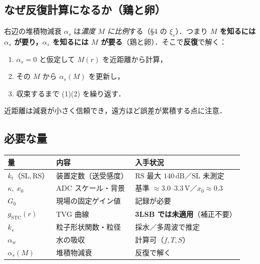 \documentclass[11pt]{ltjsarticle}
\newcommand{\unit}[1]{\,\mathrm{#1}}
\begin{document}
\subsection{なぜ反復計算になるか（鶏と卵）}
右辺の堆積物減衰 $\alpha_s$ は\emph{濃度 $M$ に比例}する（\S4 の $\xi_s$）．つまり
\textbf{$M$ を知るには $\alpha_s$ が要り，$\alpha_s$ を知るには $M$ が要る}（鶏と卵）．そこで\textbf{反復}で解く：
\begin{enumerate}[nosep]
  \item $\alpha_s=0$ と仮定して $M(r)$ を近距離から計算，
  \item その $M$ から $\alpha_s(M)$ を更新し，
  \item 収束するまで (1)(2) を繰り返す．
\end{enumerate}
近距離は減衰が小さく信頼でき，遠方ほど誤差が累積する点に注意．

\subsection{必要な量}
\begin{center}\small
\begin{tabular}{lll}
\toprule
量 & 内容 & 入手状況 \\
\midrule
$k_t$（$\mathrm{SL},\mathrm{RS}$） & 装置定数（送受感度） & $\mathrm{RS}$ 最大 $140\unit{dB}$／$\mathrm{SL}$ 未測定 \\
$\kappa,\ x_0$ & ADC スケール・背景 & 基準 $\approx3.0$–$3.3\unit{V}$／$x_0\approx0.3$ \\
$G_0$ & 現場の固定ゲイン値 & 記録が必要 \\
$g_{\mathrm{STC}}(r)$ & TVG 曲線 & \textbf{3LSB では未適用}（補正不要） \\
$k_s$ & 粒子形状関数・粒径 & 採水／多周波で推定 \\
$\alpha_w$ & 水の吸収 & 計算可（$f,T,S$） \\
$\alpha_s(M)$ & 堆積物減衰 & 反復で解く \\
\bottomrule
\end{tabular}
\end{center}
\end{document}
